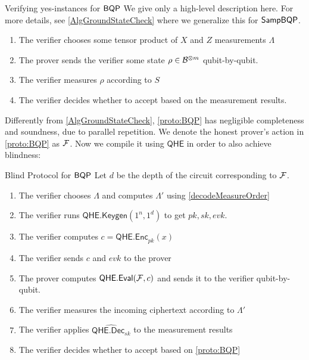 \begin{protocol}{Verifying yes-instances for $\operatorname{\mathsf{BQP}}$}
	\label{proto:BQP}
	We give only a high-level description here.
	For more details, see \cref{AlgGroundStateCheck} where we generalize this for $\operatorname{\mathsf{SampBQP}}$.
	\begin{enumerate}
		\item The verifier chooses some tensor product of $X$ and $Z$ measurements $\Lambda$
		\item The prover sends the verifier some state $\rho\in\mathcal{B}^{\otimes m}$ qubit-by-qubit. 
		\item The verifier measures $\rho$ according to $S$ 
		\item The verifier decides whether to accept based on the measurement results. 
	\end{enumerate}
\end{protocol}

Differently from \cref{AlgGroundStateCheck}, \cref{proto:BQP} has negligible completeness and soundness, due to parallel repetition.
We denote the honest prover's action in \cref{proto:BQP} as $\mathcal{F}$.
Now we compile it using $\mathsf{QHE}$ in order to also achieve blindness:

\begin{protocol}{Blind Protocol for $\operatorname{\mathsf{BQP}}$}
	\label{proto:BlindBQP}
	Let $d$ be the depth of the circuit corresponding to $\mathcal{F}$.
	\begin{enumerate}
		\item The verifier chooses $\Lambda$ and computes $\Lambda'$ using \cref{decodeMeasureOrder}
		\item The verifier runs $\mathsf{QHE.Keygen}(1^n, 1^d)$ to get $pk, sk, evk$.
		\item The verifier computes $c=\mathsf{QHE.Enc}_{pk}(x)$
		\item The verifier sends $c$ and $evk$ to the prover
		\item The prover computes $\mathsf{QHE.Eval}(\mathcal{F}, c)$ and sends it to the verifier qubit-by-qubit.
		\item The verifier measures the incoming ciphertext according to $\Lambda'$
		\item The verifier applies $\widehat{\mathsf{QHE.Dec}_{sk}}$ to the measurement results
		\item The verifier decides whether to accept based on \cref{proto:BQP}
	\end{enumerate}
\end{protocol}

